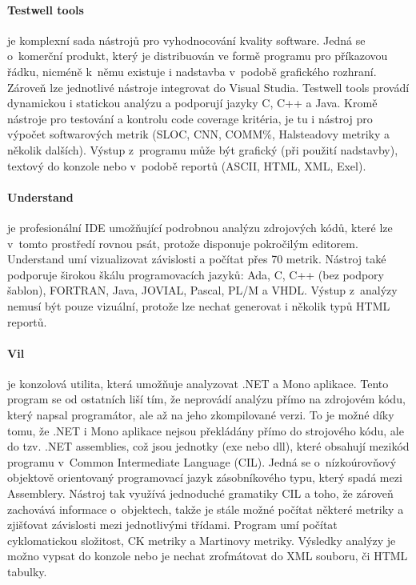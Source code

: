 \documentclass[11pt,twoside,a4paper]{book}
\begin{document}
\paragraph{Testwell tools}\cite{Testwell} je komplexní sada nástrojů pro vyhodnocování kvality software. Jedná se o~komerční produkt, který
je distribuován ve formě programu pro příkazovou řádku, nicméně k~němu existuje i nadstavba v~podobě grafického rozhraní.
Zároveň lze jednotlivé nástroje integrovat do Visual Studia. Testwell tools provádí dynamickou i statickou analýzu a podporují jazyky
C, C++ a Java. Kromě nástroje pro testování a kontrolu code coverage kritéria, je tu i nástroj pro výpočet softwarových metrik
(SLOC, CNN, COMM\%, Halsteadovy metriky a několik dalších). Výstup z~programu může být grafický (při použití nadstavby), textový do konzole
nebo v~podobě reportů (ASCII, HTML, XML, Exel).

\paragraph{Understand}\cite{Understand} je profesionální IDE umožňující podrobnou analýzu zdrojových kódů, které lze v~tomto prostředí rovnou psát, protože
disponuje pokročilým editorem. Understand umí vizualizovat závislosti a počítat přes 70 metrik. Nástroj také podporuje širokou škálu programovacích
jazyků: Ada, C, C++ (bez podpory šablon), FORTRAN, Java, JOVIAL, Pascal, PL/M a VHDL.
Výstup z~analýzy nemusí být pouze vizuální, protože lze nechat generovat i několik typů HTML reportů.

\paragraph{Vil}\cite{Vil} je konzolová utilita, která umožňuje analyzovat .NET a Mono aplikace. Tento program se od ostatních liší tím, že neprovádí
analýzu přímo na zdrojovém kódu, který napsal programátor, ale až na jeho zkompilované verzi. To je možné díky tomu, že .NET i Mono aplikace
nejsou překládány přímo do strojového kódu, ale do tzv. .NET assemblies, což jsou jednotky (exe nebo dll), které obsahují mezikód programu
v~Common Intermediate Language (CIL). Jedná se o~nízkoúrovňový objektově orientovaný programovací jazyk zásobníkového typu, který spadá mezi Assemblery.
Nástroj tak využívá jednoduché gramatiky CIL a toho, že zároveň zachovává informace o~objektech, takže je stále možné počítat některé metriky
a zjišťovat závislosti mezi jednotlivými třídami. Program umí počítat cyklomatickou složitost, CK metriky a Martinovy metriky.
Výsledky analýzy je možno vypsat do konzole nebo je nechat zrofmátovat do XML souboru, či HTML tabulky.
\end{document}
